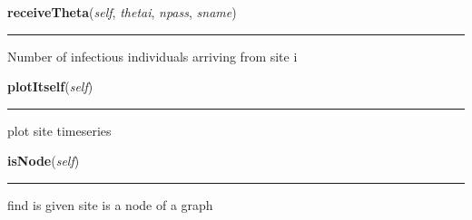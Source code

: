     \begin{boxedminipage}{\textwidth}

    \raggedright \textbf{receiveTheta}(\textit{self}, \textit{thetai}, \textit{npass}, \textit{sname})

    \vspace{-1.5ex}

    \rule{\textwidth}{0.5\fboxrule}
    Number of infectious individuals arriving from site i

    \vspace{1ex}

    \end{boxedminipage}

    \label{Epigrass:simobj:siteobj:plotItself}

    \vspace{0.5ex}

    \begin{boxedminipage}{\textwidth}

    \raggedright \textbf{plotItself}(\textit{self})

    \vspace{-1.5ex}

    \rule{\textwidth}{0.5\fboxrule}
    plot site timeseries

    \vspace{1ex}

    \end{boxedminipage}

    \label{Epigrass:simobj:siteobj:isNode}

    \vspace{0.5ex}

    \begin{boxedminipage}{\textwidth}

    \raggedright \textbf{isNode}(\textit{self})

    \vspace{-1.5ex}

    \rule{\textwidth}{0.5\fboxrule}
    find is given site is a node of a graph

    \vspace{1ex}

    \end{boxedminipage}

